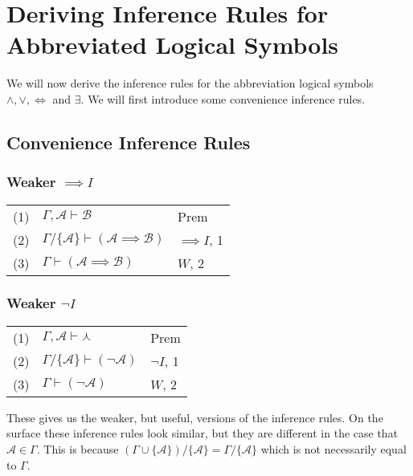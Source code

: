 \documentclass[12pt]{article}
\theoremstyle{break}
\theoremstyle{break}
\theoremstyle{break}
\theoremstyle{break}
\newcommand{\mc}[1]{\mathcal{#1}}
\begin{document}
\newpage

\section{Deriving Inference Rules for Abbreviated Logical Symbols}

We will now derive the inference rules for the abbreviation logical symbols $\land, \lor, \iff$ and $\exists$.
We will first introduce some convenience inference rules.

\subsection{Convenience Inference Rules}

\subsubsection*{Weaker $\implies I$}

\begin{center}
\begin{tabular}{ p{1cm} p{6cm} p{2cm} }
(1) & $\Gamma, \mc{A} \vdash \mc{B}$ & Prem\\
(2) & $\Gamma/\{\mc{A}\} \vdash (\mc{A} \implies \mc{B})$ & $\implies I$, 1\\
(3) & $\Gamma \vdash (\mc{A} \implies \mc{B})$ & $W$, 2
\end{tabular}
\end{center}

\subsubsection*{Weaker $\lnot I$}

\begin{center}
\begin{tabular}{ p{1cm} p{6cm} p{2cm} }
(1) & $\Gamma, \mc{A} \vdash \curlywedge$ & Prem\\
(2) & $\Gamma/\{\mc{A}\} \vdash (\lnot \mc{A})$ & $\lnot I$, 1\\
(3) & $\Gamma \vdash (\lnot \mc{A})$ & $W$, 2
\end{tabular}
\end{center}

These gives us the weaker, but useful, versions of the inference rules.
On the surface these inference rules look similar, but they are different in the case that $\mc{A} \in \Gamma$.
This is because $(\Gamma \cup \{\mc{A}\})/\{\mc{A}\} = \Gamma / \{\mc{A}\}$ which is not necessarily equal to $\Gamma$.
\end{document}
